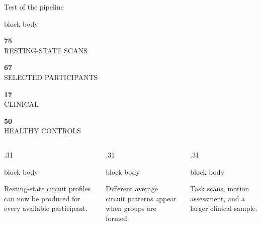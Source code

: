 \documentclass[aspectratio=169,10pt]{beamer}
\newcommand{\kpi}[2]{%
  \begin{minipage}[c][0.82cm][c]{0.22\textwidth}\centering
    {\color{Navy}\fontsize{22}{22}\selectfont\bfseries #1}\\[1pt]
    {\color{Muted}\scriptsize\MakeUppercase{#2}}
  \end{minipage}}
\begin{document}
\begin{frame}{Test of the pipeline}
\centering
\begin{beamercolorbox}[rounded=true,sep=.12cm,wd=.96\textwidth]{block body}
  \kpi{75}{resting-state scans}\kpi{67}{selected participants}\kpi{17}{clinical}\kpi{50}{healthy controls}
\end{beamercolorbox}

\vspace{.48cm}
\begin{columns}[T,onlytextwidth]
  \begin{column}{.31\textwidth}
    \begin{beamercolorbox}[rounded=true,sep=.30cm]{block body}
      {\color{Teal}\large\faCheckCircle}\par\vspace{.18cm}
      \small Resting-state circuit profiles can now be produced for every available participant.
    \end{beamercolorbox}
  \end{column}
  \begin{column}{.31\textwidth}
    \begin{beamercolorbox}[rounded=true,sep=.30cm]{block body}
      {\color{Amber}\large\faEye}\par\vspace{.18cm}
      \small Different average circuit patterns appear when groups are formed.
    \end{beamercolorbox}
  \end{column}
  \begin{column}{.31\textwidth}
    \begin{beamercolorbox}[rounded=true,sep=.30cm]{block body}
      {\color{Red}\large\faHourglassHalf}\par\vspace{.18cm}
      \small Task scans, motion assessment, and a larger clinical sample.
    \end{beamercolorbox}
  \end{column}
\end{columns}

\vspace{.48cm}
\end{frame}
\end{document}

